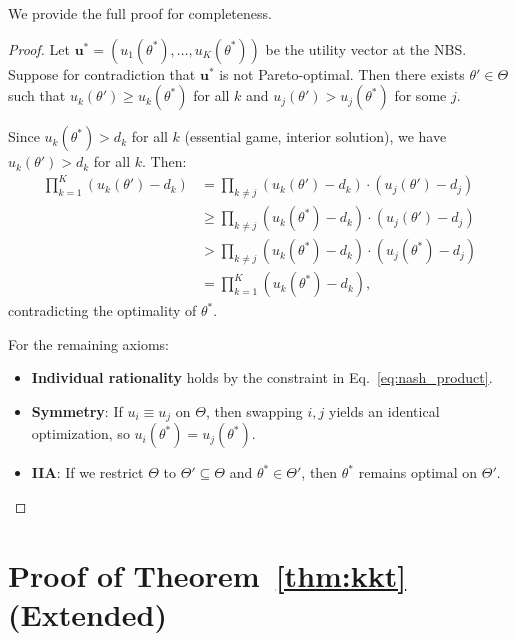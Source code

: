 \documentclass{article}
\begin{document}
We provide the full proof for completeness.

\begin{proof}
Let $\mathbf{u}^* = (u_1(\theta^*), \ldots, u_K(\theta^*))$ be the utility vector at the NBS.
Suppose for contradiction that $\mathbf{u}^*$ is not Pareto-optimal.
Then there exists $\theta' \in \Theta$ such that $u_k(\theta') \geq u_k(\theta^*)$ for all $k$ and $u_j(\theta') > u_j(\theta^*)$ for some $j$.

Since $u_k(\theta^*) > d_k$ for all $k$ (essential game, interior solution), we have $u_k(\theta') > d_k$ for all $k$.
Then:
\begin{align}
\prod_{k=1}^K (u_k(\theta') - d_k) &= \prod_{k \neq j} (u_k(\theta') - d_k) \cdot (u_j(\theta') - d_j) \\
&\geq \prod_{k \neq j} (u_k(\theta^*) - d_k) \cdot (u_j(\theta') - d_j) \\
&> \prod_{k \neq j} (u_k(\theta^*) - d_k) \cdot (u_j(\theta^*) - d_j) \\
&= \prod_{k=1}^K (u_k(\theta^*) - d_k),
\end{align}
contradicting the optimality of $\theta^*$.

For the remaining axioms:
\begin{itemize}
    \item \textbf{Individual rationality} holds by the constraint in Eq.~\eqref{eq:nash_product}.
    \item \textbf{Symmetry}: If $u_i \equiv u_j$ on $\Theta$, then swapping $i,j$ yields an identical optimization, so $u_i(\theta^*) = u_j(\theta^*)$.
    \item \textbf{IIA}: If we restrict $\Theta$ to $\Theta' \subseteq \Theta$ and $\theta^* \in \Theta'$, then $\theta^*$ remains optimal on $\Theta'$.
\end{itemize}
\end{proof}


\section{Proof of Theorem~\ref{thm:kkt} (Extended)}
\label{app:proof_kkt}
\end{document}
